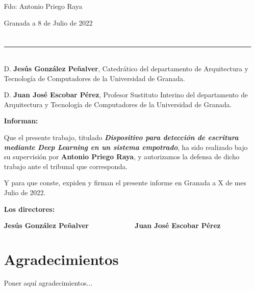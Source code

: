 \vspace{6cm}

\noindent Fdo: Antonio Priego Raya

\vspace{2cm}

\begin{flushright}
Granada a 8 de Julio de 2022
\end{flushright}


\chapter*{}
\thispagestyle{empty}

\noindent\rule[-1ex]{\textwidth}{2pt}\\[4.5ex]

D. \textbf{Jesús González Peñalver}, Catedrático del departamento de Arquitectura y Tecnología de Computadores de la Universidad de Granada.

\vspace{0.5cm}

D. \textbf{Juan José Escobar Pérez}, Profesor Sustituto Interino del departamento de Arquitectura y Tecnología de Computadores de la Universidad de Granada.

\vspace{0.5cm}

\textbf{Informan:}

\vspace{0.5cm}

Que el presente trabajo, titulado \textit{\textbf{Dispositivo para detección de escritura mediante Deep Learning en
un sistema empotrado}},
ha sido realizado bajo su supervisión por \textbf{Antonio Priego Raya}, y autorizamos la defensa de dicho trabajo ante el tribunal
que corresponda.

\vspace{0.5cm}

Y para que conste, expiden y firman el presente informe en Granada a X de mes Julio de 2022.

\vspace{1cm}

\textbf{Los directores:}

\vspace{5cm}

\noindent \textbf{Jesús González Peñalver \ \ \ \ \ \ \ \ \ \ \ Juan José Escobar Pérez}

\chapter*{Agradecimientos}
\thispagestyle{empty}

       \vspace{1cm}


Poner aquí agradecimientos...

